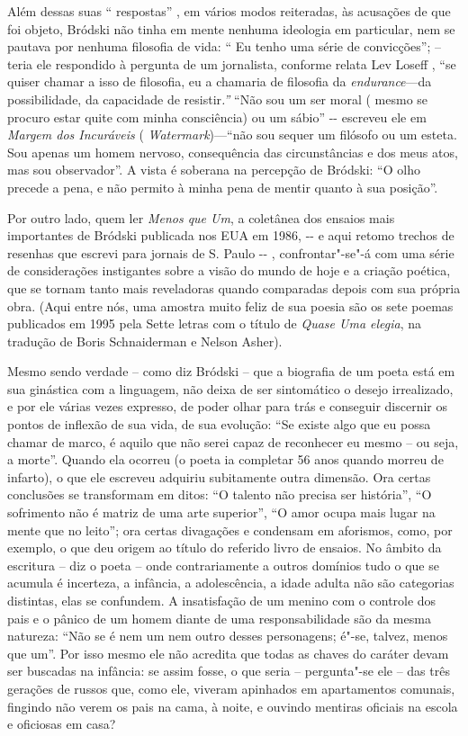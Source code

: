Além dessas suas `` respostas'' , em vários modos reiteradas, às
acusações de que foi objeto, Bródski não tinha em mente nenhuma
ideologia em particular, nem se pautava por nenhuma filosofia de vida:
`` Eu tenho uma série de convicções''; -- teria ele respondido à
pergunta de um jornalista, conforme relata Lev Loseff , ``se quiser
chamar a isso de filosofia, eu a chamaria de filosofia da
\emph{endurance}---da possibilidade, da capacidade de resistir\emph{.''}
``Não sou um ser moral ( mesmo se procuro estar quite com minha
consciência) ou um sábio'' -\/- escreveu ele em \emph{Margem dos
Incuráveis} ( \emph{Watermark})---``não sou sequer um filósofo ou um
esteta. Sou apenas um homem nervoso, consequência das circunstâncias e
dos meus atos, mas sou observador''. A vista é soberana na percepção de
Bródski: ``O olho precede a pena, e não permito à minha pena de mentir
quanto à sua posição''.

Por outro lado, quem ler \emph{Menos que Um}, a coletânea dos ensaios
mais importantes de Bródski publicada nos EUA em 1986, -\/- e aqui
retomo trechos de resenhas que escrevi para jornais de S. Paulo -\/- ,
confrontar"-se"-á com uma série de considerações instigantes sobre a visão
do mundo de hoje e a criação poética, que se tornam tanto mais
reveladoras quando comparadas depois com sua própria obra. (Aqui entre
nós, uma amostra muito feliz de sua poesia são os sete poemas publicados
em 1995 pela Sette letras com o título de \emph{Quase Uma elegia}, na
tradução de Boris Schnaiderman e Nelson Asher).

Mesmo sendo verdade -- como diz Bródski -- que a biografia de um poeta
está em sua ginástica com a linguagem, não deixa de ser sintomático o
desejo irrealizado, e por ele várias vezes expresso, de poder olhar para
trás e conseguir discernir os pontos de inflexão de sua vida, de sua
evolução: ``Se existe algo que eu possa chamar de marco, é aquilo que
não serei capaz de reconhecer eu mesmo -- ou seja, a morte''. Quando ela
ocorreu (o poeta ia completar 56 anos quando morreu de infarto), o que
ele escreveu adquiriu subitamente outra dimensão. Ora certas conclusões
se transformam em ditos: ``O talento não precisa ser história'', ``O
sofrimento não é matriz de uma arte superior'', ``O amor ocupa mais
lugar na mente que no leito''; ora certas divagações e condensam em
aforismos, como, por exemplo, o que deu origem ao título do referido
livro de ensaios. No âmbito da escritura -- diz o poeta -- onde
contrariamente a outros domínios tudo o que se acumula é incerteza, a
infância, a adolescência, a idade adulta não são categorias distintas,
elas se confundem. A insatisfação de um menino com o controle dos pais e
o pânico de um homem diante de uma responsabilidade são da mesma
natureza: ``Não se é nem um nem outro desses personagens; é"-se, talvez,
menos que um''. Por isso mesmo ele não acredita que todas as chaves do
caráter devam ser buscadas na infância: se assim fosse, o que seria --
pergunta"-se ele -- das três gerações de russos que, como ele, viveram
apinhados em apartamentos comunais, fingindo não verem os pais na cama,
à noite, e ouvindo mentiras oficiais na escola e oficiosas em casa?

